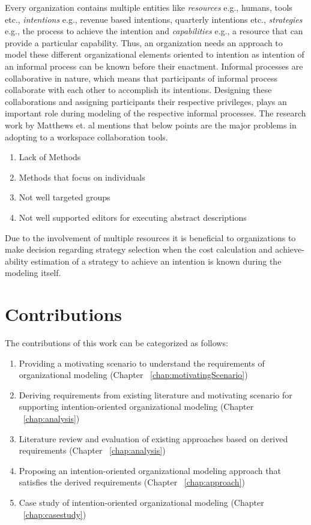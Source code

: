 Every organization contains multiple entities like \textit{resources} e.g., humans, tools etc., \textit{intentions} e.g., revenue based intentions, quarterly intentions etc., \textit{strategies} e.g., the process to achieve the intention and \textit{capabilities} e.g., a resource that can provide a particular capability. Thus, an organization needs an approach to model these different organizational elements oriented to intention as intention of an informal process can be known before their enactment. Informal processes are collaborative in nature, which means that participants of informal process collaborate with each other to accomplish its intentions\cite{Sungur2015}. Designing these collaborations and assigning participants their respective privileges, plays an important role during modeling of the respective informal processes. The research work by Matthews et. al \cite{Matthews2011} mentions that below points are the major problems in adopting to a workspace collaboration tools.

\begin{enumerate}
	\item Lack of Methods
	\item Methods that focus on individuals
	\item Not well targeted groups
	\item Not well supported editors for executing abstract descriptions
\end{enumerate}

Due to the involvement of multiple resources it is beneficial to organizations to make decision regarding strategy selection when the cost calculation and achieve-ability estimation of a strategy to achieve an intention is known during the modeling itself. 


\section {Contributions}
\label{sec:researchobjectives}
The contributions of this work can be categorized as follows:

\begin{enumerate}
	\item Providing a motivating scenario to understand the requirements of organizational modeling (Chapter ~\ref{chap:motivatingScenario})
 	\item Deriving requirements from existing literature and motivating scenario for supporting intention-oriented organizational modeling (Chapter  ~\ref{chap:analysis})
 	\item Literature review and evaluation of existing approaches based on derived requirements (Chapter ~\ref{chap:analysis})
 	\item Proposing an intention-oriented organizational modeling approach that satisfies the derived requirements (Chapter ~\ref{chap:approach})
 	\item Case study of intention-oriented organizational modeling (Chapter ~\ref{chap:casestudy})
\end{enumerate}
 


